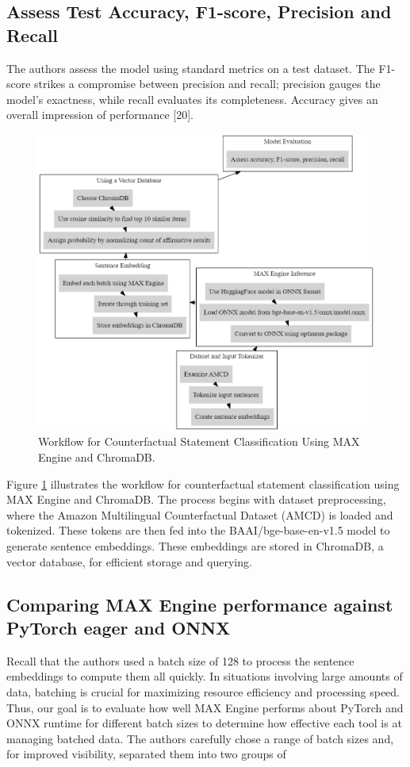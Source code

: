 \documentclass[conference]{IEEEtran}
\begin{document}
\subsection{Assess Test Accuracy, F1-score, Precision and Recall}
The authors assess the model using standard metrics on a test dataset. The F1-score strikes a compromise between precision and recall; precision gauges the model's exactness, while recall evaluates its completeness. Accuracy gives an overall impression of performance [20].
\begin{figure}[H]
    \centerline{\includegraphics[width=\linewidth]{5.png}}
    \caption{Workflow for Counterfactual Statement Classification Using MAX Engine and ChromaDB.}
    \label{fig5}
\end{figure}
Figure \ref{fig5} illustrates the workflow for counterfactual statement classification using MAX Engine and ChromaDB. The process begins with dataset preprocessing, where the Amazon Multilingual Counterfactual Dataset (AMCD) is loaded and tokenized. These tokens are then fed into the BAAI/bge-base-en-v1.5 model to generate sentence embeddings. These embeddings are stored in ChromaDB, a vector database, for efficient storage and querying.

\subsection{Comparing MAX Engine performance against PyTorch eager and ONNX}
Recall that the authors used a batch size of 128 to process the sentence embeddings to compute them all quickly. In situations involving large amounts of data, batching is crucial for maximizing resource efficiency and processing speed. Thus, our goal is to evaluate how well MAX Engine performs about PyTorch and ONNX runtime for different batch sizes to determine how effective each tool is at managing batched data. The authors carefully chose a range of batch sizes and, for improved visibility, separated them into two groups of
\end{document}
